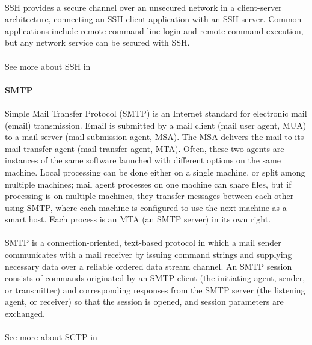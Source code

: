 \paragraph{}
SSH provides a secure channel over an unsecured network in a client-server architecture, connecting an SSH client application with an SSH server. Common applications include remote command-line login and remote command execution, but any network service can be secured with SSH. 
\paragraph{}
See more about SSH in \cite{SSH}


\paragraph{} \textbf{SMTP}
\paragraph{}
Simple Mail Transfer Protocol (SMTP) is an Internet standard for electronic mail (email) transmission. Email is submitted by a mail client (mail user agent, MUA) to a mail server (mail submission agent, MSA). The MSA delivers the mail to its mail transfer agent (mail transfer agent, MTA). Often, these two agents are instances of the same software launched with different options on the same machine. Local processing can be done either on a single machine, or split among multiple machines; mail agent processes on one machine can share files, but if processing is on multiple machines, they transfer messages between each other using SMTP, where each machine is configured to use the next machine as a smart host. Each process is an MTA (an SMTP server) in its own right.
\paragraph{}
SMTP is a connection-oriented, text-based protocol in which a mail sender communicates with a mail receiver by issuing command strings and supplying necessary data over a reliable ordered data stream channel. An SMTP session consists of commands originated by an SMTP client (the initiating agent, sender, or transmitter) and corresponding responses from the SMTP server (the listening agent, or receiver) so that the session is opened, and session parameters are exchanged.
\paragraph{}
See more about SCTP in \cite{SMTP}


